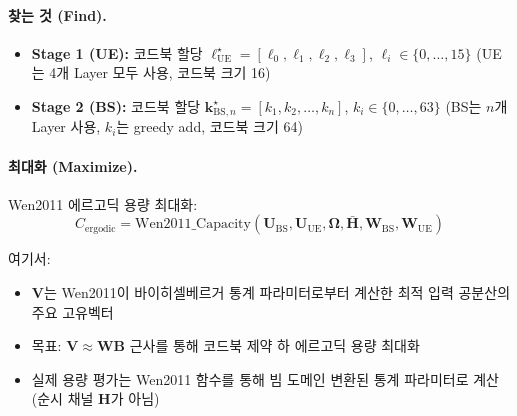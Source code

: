 \documentclass[10pt]{article}
\begin{document}
\paragraph{찾는 것 (Find).}
\begin{itemize}
    \item \textbf{Stage 1 (UE):} 코드북 할당 $\boldsymbol{\ell}_{\text{UE}}^{\star} = [\ell_0, \ell_1, \ell_2, \ell_3]$, $\ell_i \in \{0, \ldots, 15\}$ (UE는 4개 Layer 모두 사용, 코드북 크기 16)
    \item \textbf{Stage 2 (BS):} 코드북 할당 $\boldsymbol{k}_{\text{BS},n}^{\star} = [k_1, k_2, \ldots, k_n]$, $k_i \in \{0, \ldots, 63\}$ (BS는 $n$개 Layer 사용, $k_i$는 greedy add, 코드북 크기 64)
\end{itemize}

\paragraph{최대화 (Maximize).}
Wen2011 에르고딕 용량 최대화:
\begin{equation}
C_{\text{ergodic}} = \text{Wen2011\_Capacity}(\mathbf{U}_{\text{BS}}, \mathbf{U}_{\text{UE}}, \boldsymbol{\Omega}, \bar{\mathbf{H}}, \mathbf{W}_{\text{BS}}, \mathbf{W}_{\text{UE}})
\end{equation}

여기서:
\begin{itemize}
    \item $\mathbf{V}$는 Wen2011이 바이히셀베르거 통계 파라미터로부터 계산한 최적 입력 공분산의 주요 고유벡터
    \item 목표: $\mathbf{V} \approx \mathbf{W}\mathbf{B}$ 근사를 통해 코드북 제약 하 에르고딕 용량 최대화
    \item 실제 용량 평가는 Wen2011 함수를 통해 빔 도메인 변환된 통계 파라미터로 계산 (순시 채널 $\mathbf{H}$가 아님)
\end{itemize}
\end{document}
